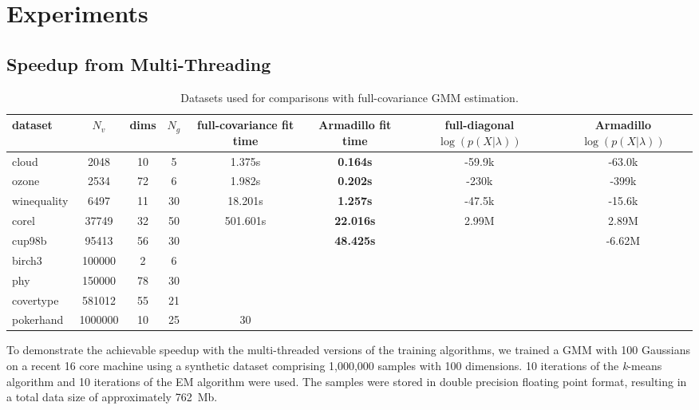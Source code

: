 \section{Experiments}
\label{sec:speedup}

\subsection{Speedup from Multi-Threading}

\begin{table*}
\begin{center}
\begin{tabular}{|l|c|c|c|c|c|c|c|}
\hline
{\bf dataset} & {\bf $N_v$} & {\bf dims} & {\bf $N_g$} & {\bf
full-covariance fit time} & {\bf Armadillo fit time} & {\bf full-diagonal
$\log(p(X|\lambda))$} & {\bf Armadillo $\log(p(X|\lambda))$} \\
\hline
cloud & 2048 & 10 & 5 & 1.375s & {\bf 0.164s} & -59.9k & -63.0k \\
ozone & 2534 & 72 & 6 & 1.982s & {\bf 0.202s} & -230k & -399k \\
winequality & 6497 & 11 & 30 & 18.201s & {\bf 1.257s} & -47.5k & -15.6k \\
corel & 37749 & 32 & 50 & 501.601s & {\bf 22.016s} & 2.99M & 2.89M \\
cup98b & 95413 & 56 & 30 & & {\bf 48.425s} &  & -6.62M \\
birch3 & 100000 & 2 & 6 & \\
phy & 150000 & 78 & 30 & \\
covertype & 581012 & 55 & 21 & \\
pokerhand & 1000000 & 10 & 25 & 30 & \\
\hline
\end{tabular}
\end{center}
\caption{Datasets used for comparisons with full-covariance GMM estimation.}
\label{tab:results}
\end{table*}

To demonstrate the achievable speedup with the multi-threaded versions of the training algorithms,
we trained a GMM with 100 Gaussians on a recent 16 core machine using a synthetic dataset comprising 1,000,000 samples with 100 dimensions.
10 iterations of the {\it k}-means algorithm and 10 iterations of the EM algorithm were used.
The samples were stored in double precision floating point format, resulting in a total data size of approximately 762~Mb.

